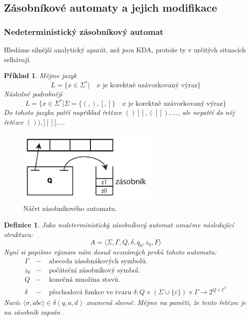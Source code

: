\documentclass[10pt,a4paper]{article}
\theoremstyle{note}
\newtheorem{definice}{Definice}
\newtheorem{priklad}{Příklad}
\begin{document}
	\subsection{Zásobníkové automaty a jejich modifikace}

\subsubsection{Nedeterministický zásobníkový automat}
Hledáme silnější analytický aparát, než jsou KDA, protože ty v určitých situacích selhávají.

\begin{priklad}
Mějme jazyk
$$L = \lbrace x \in \Sigma^{*}| \quad x \text{ je korektně uzávorkovaný výraz} \rbrace$$
Následně podrobněji
$$L = \lbrace x \in \Sigma^{*}| \Sigma = \lbrace (,),[,] \rbrace \quad x \text{ je korektně uzávorkovaný výraz} \rbrace$$
Do tohoto jazyka patří například řetězce $()[], ([]), \ldots$, ale nepatří do něj řetězce $()), ][][, \ldots$
\end{priklad}

\begin{figure}[H]
\centering\includegraphics[width=7cm]{img/ZA.png}
\caption{Náčrt zásobníkového automatu.}
\end{figure}

\begin{definice}
Jako \textit{nedeterministický zásobníkový automat} označme následující strukturu:
$$
A = \langle \Sigma, \Gamma, Q, \delta, q_0, z_0, F \rangle
$$
Nyní si popišme význam nám dosud neznámých prvků tohoto automatu:
\begin{eqnarray*}
\Gamma &-& \text{ abeceda zásobnákových symbolů.} \\
z_0 &-& \text{ počáteční zásobníkový symbol.} \\
Q &-& \text{ konečná množina stavů.} \\
\delta &-& \text{ přechodová funkce ve tvaru } \delta : Q \times (\Sigma \cup \lbrace \varepsilon \rbrace) \times \Gamma \rightarrow 2^{Q \times \Gamma^{*}}
\end{eqnarray*}
Navíc $\langle \sigma, abc \rangle \in \delta(q, a, d)$ znamená slovně:  Mějme na paměti, že tento řetězec je na zásobník zapsán .
\end{definice}
\end{document}
